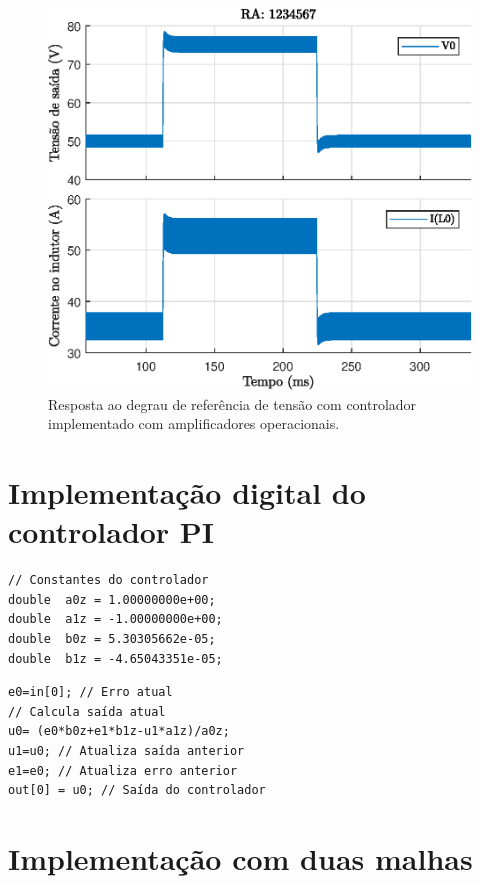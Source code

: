 \begin{figure}[!ht]
	\centering
	\includegraphics[width=0.9\linewidth]{Figs/Buck1malhaAmpOp}
	\caption{Resposta ao degrau de referência de tensão com controlador implementado com amplificadores operacionais.}
	\label{fig:buck1malhaAmpOp}
\end{figure}



\section{Implementação digital do controlador PI}


\begin{lstlisting}[caption={Parâmetros do controlador PI digital de tensão.},label={lst:valoresPI}]
// Constantes do controlador
double  a0z = 1.00000000e+00;
double  a1z = -1.00000000e+00;
double  b0z = 5.30305662e-05;
double  b1z = -4.65043351e-05;
\end{lstlisting}

\begin{lstlisting}[caption={Implementação do controlador PI digital de tensão.},label={lst:implementacaoPI}]
e0=in[0]; // Erro atual
// Calcula saída atual 
u0= (e0*b0z+e1*b1z-u1*a1z)/a0z; 
u1=u0; // Atualiza saída anterior
e1=e0; // Atualiza erro anterior    
out[0] = u0; // Saída do controlador
\end{lstlisting}


\section{Implementação com duas malhas}


